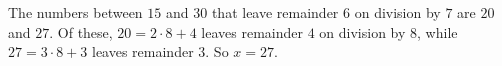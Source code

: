 The numbers between $15$ and $30$ that leave remainder $6$ on division by $7$ are $20$ and $27$. Of these, $20=2\cdot8+4$ leaves remainder $4$ on division by $8$, while $27=3\cdot8+3$ leaves remainder $3$. So $x=\boxed{27}$.
